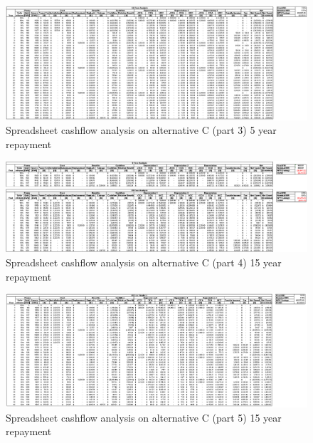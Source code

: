 \documentclass[10pt,letterpaper]{article}
\begin{document}
\begin{figure}[H]
	\centering
	\includegraphics[width=1.0\textwidth]{assets/1534570912032}
	\caption{Spreadsheet cashflow analysis on alternative C (part 3) 5 year repayment}
\end{figure}

\begin{figure}[H]
	\centering
	\includegraphics[width=1.0\textwidth]{assets/1534570923844}
	\caption{Spreadsheet cashflow analysis on alternative C (part 4) 15 year repayment}
\end{figure}

\begin{figure}[H]
	\centering
	\includegraphics[width=1.0\textwidth]{assets/1534570934621}
	\caption{Spreadsheet cashflow analysis on alternative C (part 5) 15 year repayment}
\end{figure}
\end{document}
